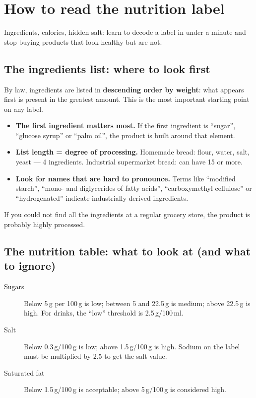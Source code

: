 \documentclass[a5paper,12pt,oneside,openany]{book}
\newcommand{\boxinfo}[2]{%
  \begin{tcolorbox}[boxbase,
    colback=infoBlue!8!white, colframe=infoBlue, title={#1}]
  #2\end{tcolorbox}}
\begin{document}
\chapter{How to read the nutrition label}

Ingredients, calories, hidden salt: learn to decode a label in under a
minute and stop buying products that look healthy but are not.

\section{The ingredients list: where to look first}

By law, ingredients are listed in \textbf{descending order by weight}:
what appears first is present in the greatest amount. This is the most
important starting point on any label.

\begin{itemize}
  \item \textbf{The first ingredient matters most.} If the first ingredient
    is ``sugar'', ``glucose syrup'' or ``palm oil'', the product is built
    around that element.
  \item \textbf{List length = degree of processing.} Homemade bread: flour,
    water, salt, yeast --- 4 ingredients. Industrial supermarket bread:
    can have 15 or more.
  \item \textbf{Look for names that are hard to pronounce.} Terms like
    ``modified starch'', ``mono- and diglycerides of fatty acids'',
    ``carboxymethyl cellulose'' or ``hydrogenated'' indicate industrially
    derived ingredients.
\end{itemize}

\boxinfo{Practical rule}{If you could not find all the ingredients at a
regular grocery store, the product is probably highly processed.}

\section{The nutrition table: what to look at (and what to ignore)}

\begin{description}
  \item[Sugars] Below 5\,g per 100\,g is low; between 5 and 22.5\,g is
    medium; above 22.5\,g is high. For drinks, the ``low'' threshold is
    2.5\,g/100\,ml.
  \item[Salt] Below 0.3\,g/100\,g is low; above 1.5\,g/100\,g is high.
    Sodium on the label must be multiplied by 2.5 to get the salt value.
  \item[Saturated fat] Below 1.5\,g/100\,g is acceptable; above
    5\,g/100\,g is considered high.
\end{description}
\end{document}
